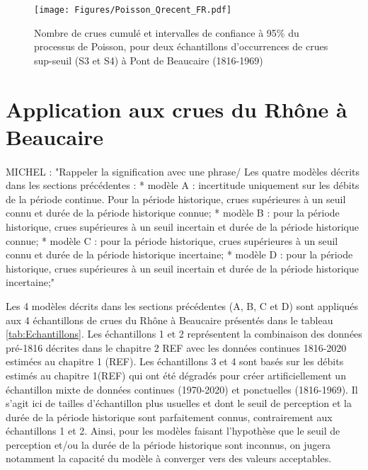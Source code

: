 \documentclass[11pt]{article}
\begin{document}
	\begin{figure}[h]
		\centering
		\texttt{[image: Figures/Poisson\_Qrecent\_FR.pdf]}	
		\caption{Nombre de crues cumulé et intervalles de confiance à 95\% du processus de 						Poisson, pour deux échantillons d'occurrences de crues sup-seuil (S3 et S4) à Pont de Beaucaire 							(1816-1969) }
		\label{fig:Poisson_Recent}
	\end{figure}
	
	
		
\FloatBarrier		
	
	
\section{Application aux crues du Rhône à Beaucaire}

	\paragraph{}
	
	MICHEL : "Rappeler la signification avec une phrase/
Les quatre modèles décrits dans les sections précédentes :
* modèle A : incertitude uniquement sur les débits de la période continue. Pour la période historique, crues supérieures à un seuil connu et durée de la période historique connue;
* modèle B : pour la période historique, crues supérieures à un seuil incertain et durée de la période historique connue;
* modèle C : pour la période historique, crues supérieures à un seuil connu et durée de la période historique incertaine;
* modèle D : pour la période historique, crues supérieures à un seuil incertain et durée de la période historique incertaine;"

	Les 4 modèles décrits dans les sections précédentes (A, B, C et D) sont appliqués aux 4 échantillons de crues du Rhône à Beaucaire présentés dans le tableau \ref{tab:Echantillons}. Les échantillons 1 et 2 représentent la combinaison des données pré-1816 décrites dans le chapitre 2 REF avec les données continues 1816-2020 estimées au chapitre 1 (REF). Les échantillons 3 et 4 sont basés sur les débits estimés au chapitre 1(REF) qui ont été dégradés pour créer artificiellement un échantillon mixte de données continues (1970-2020) et ponctuelles (1816-1969). Il s'agit ici de tailles d'échantillon plus usuelles et dont le seuil de perception et la durée de la période historique sont parfaitement connus, contrairement aux échantillons 1 et 2. Ainsi, pour les modèles faisant l'hypothèse que le seuil de perception et/ou la durée de la période historique sont inconnus, on jugera notamment la capacité du modèle à converger vers des valeurs acceptables. 
	
\end{document}
